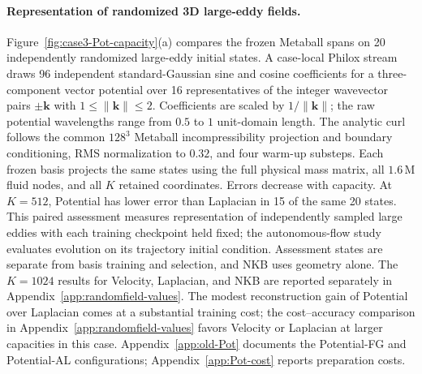 \paragraph{Representation of randomized 3D large-eddy fields.}
Figure~\ref{fig:case3-Pot-capacity}(a) compares the frozen Metaball spans on 20 independently randomized large-eddy initial states. A case-local Philox stream draws 96 independent standard-Gaussian sine and cosine coefficients for a three-component vector potential over 16 representatives of the integer wavevector pairs $\pm\boldsymbol{k}$ with $1\leq\|\boldsymbol{k}\|\leq2$. Coefficients are scaled by $1/\|\boldsymbol{k}\|$; the raw potential wavelengths range from $0.5$ to $1$ unit-domain length. The analytic curl follows the common $128^3$ Metaball incompressibility projection and boundary conditioning, RMS normalization to $0.32$, and four warm-up substeps. Each frozen basis projects the same states using the full physical mass matrix, all $1.6\,\mathrm{M}$ fluid nodes, and all $K$ retained coordinates. Errors decrease with capacity. At $K=512$, Potential has lower error than Laplacian in 15 of the same 20 states. This paired assessment measures representation of independently sampled large eddies with each training checkpoint held fixed; the autonomous-flow study evaluates evolution on its trajectory initial condition. Assessment states are separate from basis training and selection, and NKB uses geometry alone. The $K=1024$ results for Velocity, Laplacian, and NKB are reported separately in Appendix~\ref{app:randomfield-values}. The modest reconstruction gain of Potential over Laplacian comes at a substantial training cost; the cost--accuracy comparison in Appendix~\ref{app:randomfield-values} favors Velocity or Laplacian at larger capacities in this case. Appendix~\ref{app:old-Pot} documents the Potential-FG and Potential-AL configurations; Appendix~\ref{app:Pot-cost} reports preparation costs.
